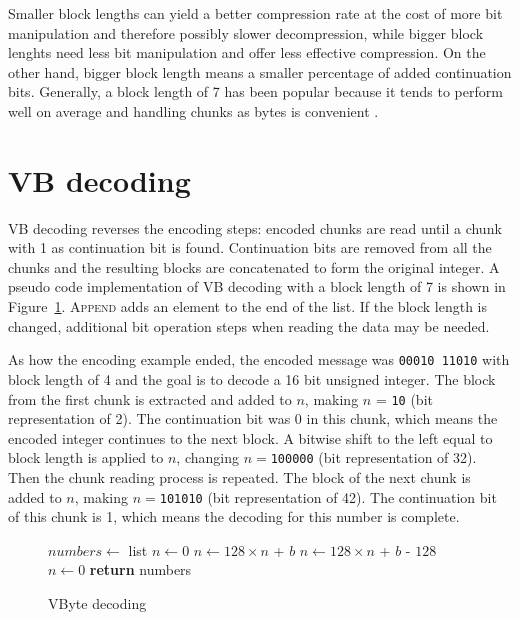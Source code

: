 Smaller block lengths can yield a better compression rate at the cost of more bit manipulation and therefore possibly slower decompression, while bigger block lenghts need less bit manipulation and 
offer less effective compression. On the other hand, bigger block length means a smaller percentage of added continuation bits.
Generally, a block length of 7 has been popular because it tends to perform well on average and handling chunks as bytes is 
convenient \citep{Man08}.


\section{VB decoding}
VB decoding reverses the encoding steps: encoded chunks are read until a chunk with 1 as continuation bit is found. Continuation bits 
are removed from all the chunks and the resulting blocks are concatenated to form the original integer. A pseudo code implementation of VB decoding with a block length of 7 is shown in Figure~\ref{vbyte_dec}.
\textsc{Append} adds an element to the end of the list. If the block length is changed, additional bit operation steps when reading the data may be needed.

As how the encoding example ended, the encoded message was \texttt{00010 11010} with block length of 4 and the goal is to decode a 16 bit unsigned integer. The block from the first chunk is 
extracted and added to $n$, making $n$ = \texttt{10} (bit representation of 2).
The continuation bit was 0 in this chunk, which means the encoded integer continues to the next block. A bitwise shift to the left equal to block length is applied to $n$, 
changing $n = $\texttt{100000} (bit representation of 32). Then the chunk reading process is repeated. The block of the next chunk is added to $n$, making 
$n = $\texttt{101010} (bit representation of 42). The continuation bit of this chunk is 1, which means the decoding for this number is complete. 

\begin{figure}[ht]
\centering
  \begin{minipage}{0.5\linewidth}
\begin{algorithmic}[H]
\State $numbers\gets $ list
\State $n\gets 0$
\State $n\gets 128\times n $ + $b$
\Else
\State $n\gets 128\times n $ + $b$ - $128$
\State {}
\State $n\gets 0$
\EndIf
\EndFor
\State \textbf{return} numbers
\EndFunction
\end{algorithmic}
\end{minipage}
\caption{VByte decoding} \label{vbyte_dec}
\end{figure}



